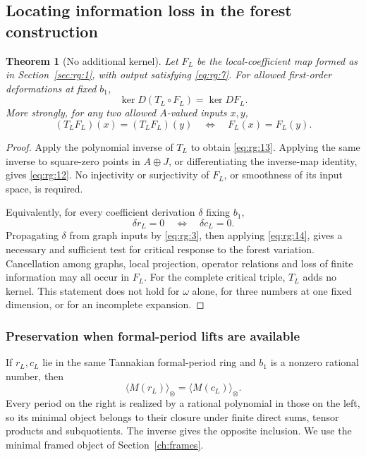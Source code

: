 \documentclass[11pt,a4paper,oneside]{article}
\theoremstyle{plain}
\newtheorem{theorem}{Theorem}[section]
\theoremstyle{definition}
\theoremstyle{remark}
\numberwithin{equation}{section}
\begin{document}
\subsection{Locating information loss in the forest construction}\label{sec:rg:5}
\begin{theorem}[No additional kernel]\label{thm:rg:5.1}
Let $F_L$ be the local-coefficient map formed as in Section~\ref{sec:rg:1}, with output satisfying \eqref{eq:rg:7}. For allowed first-order deformations at fixed $b_1$,
\begin{equation}
\ker D(T_L\circ F_L)=\ker DF_L.                   \label{eq:rg:12}
\end{equation}
More strongly, for any two allowed $A$-valued inputs $x,y$,
\begin{equation}
(T_LF_L)(x)=(T_LF_L)(y)
       \quad\Longleftrightarrow\quad F_L(x)=F_L(y). \label{eq:rg:13}
\end{equation}
\end{theorem}
\begin{proof}
Apply the polynomial inverse of $T_L$ to obtain \eqref{eq:rg:13}. Applying the same inverse to square-zero points in $A\oplus J$, or differentiating the inverse-map identity, gives \eqref{eq:rg:12}. No injectivity or surjectivity of $F_L$, or smoothness of its input space, is required.

Equivalently, for every coefficient derivation $\delta$ fixing $b_1$,
\begin{equation}
\delta r_L=0\quad\Longleftrightarrow\quad\delta c_L=0. \label{eq:rg:14}
\end{equation}
Propagating $\delta$ from graph inputs by \eqref{eq:rg:3}, then applying \eqref{eq:rg:14}, gives a necessary and sufficient test for critical response to the forest variation. Cancellation among graphs, local projection, operator relations and loss of finite information may all occur in $F_L$. For the complete critical triple, $T_L$ adds no kernel. This statement does not hold for $\omega$ alone, for three numbers at one fixed dimension, or for an incomplete expansion.
\end{proof}

\subsubsection{Preservation when formal-period lifts are available}\label{sec:rg:5.2}
If $r_L,c_L$ lie in the same Tannakian formal-period ring and $b_1$ is a nonzero rational number, then
\begin{equation}
\langle M(r_L)\rangle_\otimes
       =\langle M(c_L)\rangle_\otimes.              \label{eq:rg:15}
\end{equation}
Every period on the right is realized by a rational polynomial in those on the left, so its minimal object belongs to their closure under finite direct sums, tensor products and subquotients. The inverse gives the opposite inclusion. We use the minimal framed object of Section~\ref{ch:frames}.
\end{document}
